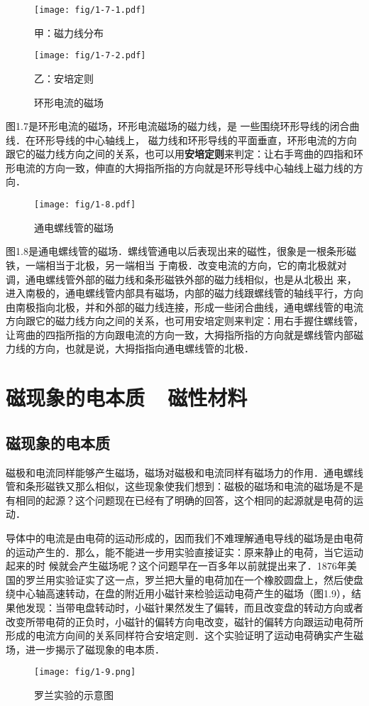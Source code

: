 \begin{figure}[htp]
\centering
\begin{minipage}[t]{0.48\textwidth}
\centering
\texttt{[image: fig/1-7-1.pdf]}
\caption*{甲：磁力线分布}
\end{minipage}
\begin{minipage}[t]{0.48\textwidth}
\centering
\texttt{[image: fig/1-7-2.pdf]}
\caption*{乙：安培定则}
\end{minipage}
\caption{环形电流的磁场}
\end{figure}

图1.7是环形电流的磁场，环形电流磁场的磁力线，是
一些围绕环形导线的闭合曲线．在环形导线的中心轴线上，
磁力线和环形导线的平面垂直，环形电流的方向跟它的磁力线方向之间的关系，也可以用\textbf{安培定则}来判定：让右手弯曲的四指和环形电流的方向一致，伸直的大拇指所指的方向就是环形导线中心轴线上磁力线的方向．

\begin{figure}[htp]\centering
\texttt{[image: fig/1-8.pdf]}
\caption{通电螺线管的磁场}
\end{figure}

图1.8是通电螺线管的磁场．螺线管通电以后表现出来的磁性，很象是一根条形磁铁，一端相当于北极，另一端相当
于南极．改变电流的方向，它的南北极就对调，通电螺线管外部的磁力线和条形磁铁外部的磁力线相似，也是从北极出
来，进入南极的，通电螺线管内部具有磁场，内部的磁力线跟螺线管的轴线平行，方向由南极指向北极，并和外部的磁力线连接，形成一些闭合曲线，通电螺线管的电流方向跟它的磁力线方向之间的关系，也可用安培定则来判定：用右手握住螺线管，让弯曲的四指所指的方向跟电流的方向一致，大拇指所指的方向就是螺线管内部磁力线的方向，也就是说，大拇指指向通电螺线管的北极．

\section{磁现象的电本质~~磁性材料}
\subsection{磁现象的电本质}


磁极和电流同样能够产生磁场，磁场对磁极和电流同样有磁场力的作用．通电螺线管和条形磁铁又那么相似，这些现象使我们想到：磁极的磁场和电流的磁场是不是有相同的起源？这个问题现在已经有了明确的回答，这个相同的起源就是电荷的运动．

导体中的电流是由电荷的运动形成的，因而我们不难理解通电导线的磁场是由电荷的运动产生的．那么，能不能进一步用实验直接证实：原来静止的电荷，当它运动起来的时
候就会产生磁场呢？这个问题早在一百多年以前就提出来了．1876年美国的罗兰用实验证实了这一点，罗兰把大量的电荷加在一个橡胶圆盘上，然后使盘绕中心轴高速转动，在盘的附近用小磁针来检验运动电荷产生的磁场（图1.9），结果他发现：当带电盘转动时，小磁针果然发生了偏转，而且改变盘的转动方向或者改变所带电荷的正负时，小磁针的偏转方向电改变，磁针的偏转方向跟运动电荷所形成的电流方向间的关系同样符合安培定则．这个实验证明了运动电荷确实产生磁场，进一步揭示了磁现象的电本质．
\begin{figure}[htp]\centering
\texttt{[image: fig/1-9.png]}
\caption{罗兰实验的示意图}
\end{figure}

